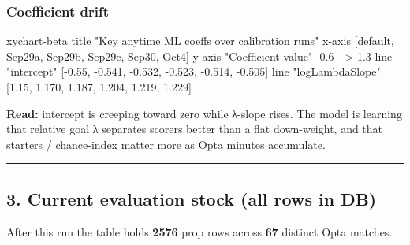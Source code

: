 \documentclass[
]{article}
\newenvironment{Shaded}{\begin{snugshade}}{\end{snugshade}}
\newcommand{\NormalTok}[1]{#1}
\begin{document}
\subsubsection{Coefficient drift}\label{coefficient-drift}

\begin{Shaded}
\begin{Highlighting}[]
\NormalTok{xychart{-}beta}
\NormalTok{  title "Key anytime ML coeffs over calibration runs"}
\NormalTok{  x{-}axis [default, Sep29a, Sep29b, Sep29c, Sep30, Oct4]}
\NormalTok{  y{-}axis "Coefficient value" {-}0.6 {-}{-}\textgreater{} 1.3}
\NormalTok{  line "intercept" [{-}0.55, {-}0.541, {-}0.532, {-}0.523, {-}0.514, {-}0.505]}
\NormalTok{  line "logLambdaSlope" [1.15, 1.170, 1.187, 1.204, 1.219, 1.229]}
\end{Highlighting}
\end{Shaded}

\textbf{Read:} intercept is creeping toward zero while λ-slope rises.
The model is learning that relative goal λ separates scorers better than
a flat down-weight, and that starters / chance-index matter more as Opta
minutes accumulate.

\begin{center}\rule{0.5\linewidth}{0.5pt}\end{center}

\subsection{3. Current evaluation stock (all rows in
DB)}\label{current-evaluation-stock-all-rows-in-db}

After this run the table holds \textbf{2576} prop rows across
\textbf{67} distinct Opta matches.
\end{document}
